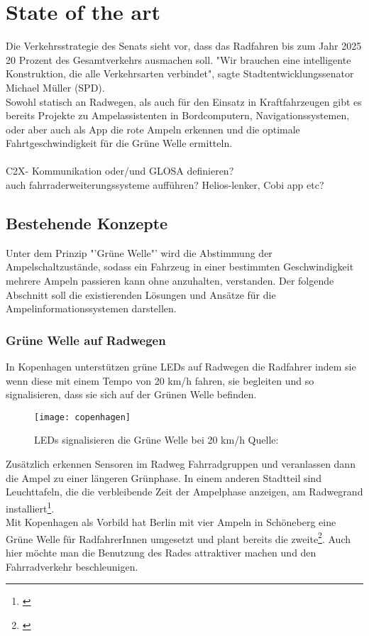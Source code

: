 \chapter{State of the art}
Die Verkehrsstrategie des Senats sieht vor, dass das Radfahren bis zum Jahr 2025 20 Prozent des Gesamtverkehrs ausmachen soll. \cite{Mopo}
"Wir brauchen eine intelligente Konstruktion, die alle Verkehrsarten verbindet", sagte Stadtentwicklungssenator Michael Müller (SPD).\\
Sowohl statisch an Radwegen, als auch für den Einsatz in Kraftfahrzeugen gibt es bereits Projekte zu Ampelassistenten in Bordcomputern, Navigationssystemen, oder aber auch als App die rote Ampeln erkennen und die optimale Fahrtgeschwindigkeit für die Grüne Welle ermitteln.\\\\
\gls{C2X}- Kommunikation oder/und \gls{GLOSA} definieren?\\
auch fahrraderweiterungssysteme aufführen? Helios-lenker, Cobi app etc?
\section{Bestehende Konzepte}
Unter dem Prinzip "'Grüne Welle"' wird die Abstimmung der Ampelschaltzustände, sodass ein Fahrzeug in einer bestimmten Geschwindigkeit mehrere Ampeln passieren kann ohne anzuhalten, verstanden. Der folgende Abschnitt soll die existierenden Lösungen und Ansätze für die Ampelinformationssystemen darstellen.
\subsection{Grüne Welle auf Radwegen}
In Kopenhagen unterstützen grüne \gls{LED}s auf Radwegen die Radfahrer indem sie wenn diese mit einem Tempo von 20 km/h fahren, sie begleiten und so signalisieren, dass sie sich auf der Grünen Welle befinden. 
\begin{figure}[H]  
    \centering  
    \texttt{[image: copenhagen]}
    \label{fig:copenhagen}
    \caption[Grüne Welle durch \gls{LED}s]{\gls{LED}s signalisieren die Grüne Welle bei 20 km/h  Quelle: \cite{NYT}}
\end{figure}
Zusätzlich erkennen Sensoren im Radweg Fahrradgruppen und veranlassen dann die Ampel zu einer längeren Grünphase. In einem anderen Stadtteil sind Leuchttafeln, die die verbleibende Zeit der Ampelphase anzeigen, am Radwegrand installiert\footnote{\cite{KopIng}}.\\
Mit Kopenhagen als Vorbild hat Berlin mit vier Ampeln in Schöneberg eine Grüne Welle für RadfahrerInnen umgesetzt und plant bereits die zweite\footnote{\cite{BZ}}. Auch hier möchte man die Benutzung des Rades attraktiver machen und den Fahrradverkehr beschleunigen.
